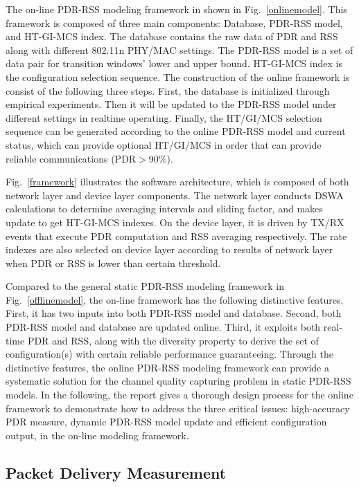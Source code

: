 \documentclass[draftclsnofoot,journal,onecolumn,11pt]{IEEEtran}
\begin{document}
The on-line PDR-RSS modeling framework in shown in Fig.~\ref{onlinemodel}. This framework is composed of three main components: Database, PDR-RSS model, and HT-GI-MCS index. The database contains the raw data of PDR and RSS along with different 802.11n PHY/MAC settings. The PDR-RSS model is a set of data pair for transition windows' lower and upper bound. HT-GI-MCS index is the configuration selection sequence. The construction of the online framework is consist of the following three steps. First, the database is initialized through empirical experiments. Then it will be updated to the PDR-RSS model under different settings in realtime operating. Finally, the HT/GI/MCS selection sequence can be generated according to the online PDR-RSS model and current status, which can provide optional HT/GI/MCS in order that can provide reliable communications (PDR$>$90\%).

Fig.~\ref{framework} illustrates the software architecture, which is composed of both network layer and device layer components. The network layer conducts DSWA calculations to determine averaging intervals and sliding factor, and makes update to get HT-GI-MCS indexes. On the device layer, it is driven by TX/RX events that execute PDR computation and RSS averaging respectively. The rate indexes are also selected on device layer according to results of network layer when PDR or RSS is lower than certain threshold.

Compared to the general static PDR-RSS modeling framework in Fig.~\ref{offlinemodel}, the on-line framework has the following distinctive features. First, it has two inputs into both PDR-RSS model and database. Second, both PDR-RSS model and database are updated online. Third, it exploits both real-time PDR and RSS, along with the diversity property to derive the set of configuration(s) with certain reliable performance guaranteeing. Through the distinctive features, the online PDR-RSS modeling framework can provide a systematic solution for the channel quality capturing problem in static PDR-RSS models. In the following, the report gives a thorough design process for the online framework to demonstrate how to address the three critical issues: high-accuracy PDR measure, dynamic PDR-RSS model update and efficient configuration output, in the on-line modeling framework.

\subsection{Packet Delivery Measurement} \label{sect:methodology}
\end{document}

